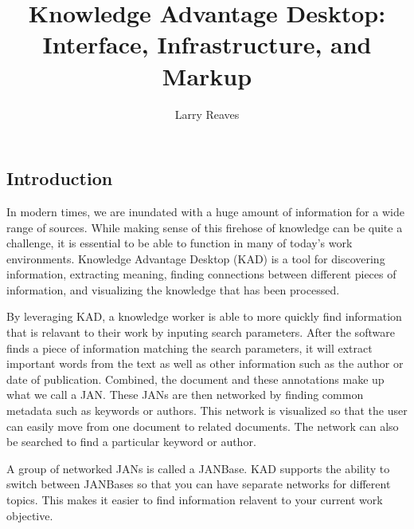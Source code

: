 \documentclass{article}
\begin{document}
\title{Knowledge Advantage Desktop: Interface, Infrastructure, and Markup}
\author{Larry Reaves}
\maketitle
\pagebreak
\begin{doublespace}
\section{Introduction}
In modern times, we are inundated with a huge amount of information for a wide range of sources.
While making sense of this firehose of knowledge can be quite a challenge, it is essential to be able
to function in many of today's work environments.
Knowledge Advantage Desktop (KAD) is a tool for discovering information, extracting meaning,
finding connections between different pieces of information,
and visualizing the knowledge that has been processed.
\par
By leveraging KAD, a knowledge worker is able to more quickly find information that is relavant to their
work by inputing search parameters.
After the software finds a piece of information matching the search parameters,
it will extract important words from the text as well as other information such as the author or date of publication.
Combined, the document and these annotations make up what we call a JAN.
These JANs are then networked by finding common metadata such as keywords or authors.
This network is visualized so that the user can easily move from one document to related documents.
The network can also be searched to find a particular keyword or author.
\par
A group of networked JANs is called a JANBase.
KAD supports the ability to switch between JANBases so that you can have separate networks for different topics.
This makes it easier to find information relavent to your current work objective.

\end{doublespace}
\end{document}
